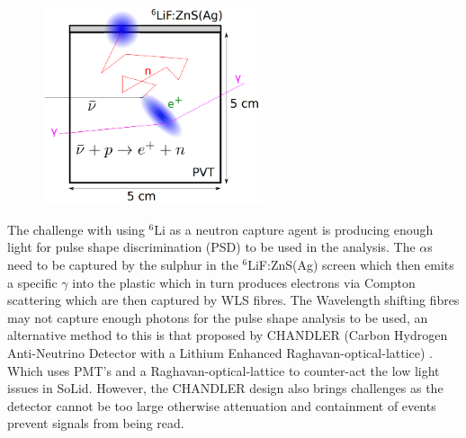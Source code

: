 \begin{figure}[!h]
 \centering
 \includegraphics[height=58mm]{Chapter2/Figs/Raster/SoLid_cube.png}
 \label{fig:SolidCubeDiagram}
\end{figure}

The challenge with using $^6$Li as a neutron capture agent is producing enough light for pulse shape discrimination (PSD) to be used in the analysis. The $\alpha$s need to be captured by the sulphur in the $^6$LiF:ZnS(Ag) screen which then emits a specific $\gamma$ into the plastic which in turn produces electrons via Compton scattering which are then captured by WLS fibres. The Wavelength shifting fibres may not capture enough photons for the pulse shape analysis to be used, an alternative method to this is that proposed by CHANDLER (Carbon Hydrogen Anti-Neutrino Detector with a Lithium Enhanced Raghavan-optical-lattice) \cite{aap2015}. Which uses PMT's and a Raghavan-optical-lattice to counter-act the low light issues in SoLid. However, the CHANDLER design also brings challenges as the detector cannot be too large otherwise attenuation and containment of events prevent signals from being read. 







